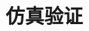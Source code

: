 \documentclass[12pt,a4paper]{article}
\newcommand{\figph}[1]{%
  \begin{center}
  \fbox{\parbox{0.72\textwidth}{\centering\vspace{2ex}#1\vspace{2ex}}}
  \end{center}}
\begin{document}
% 
% 



% 



\section{仿真验证}
\end{document}
